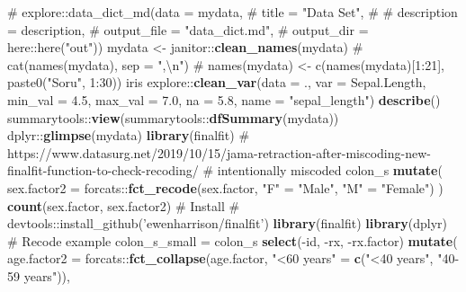 \documentclass[
]{article}
\newenvironment{Shaded}{\begin{snugshade}}{\end{snugshade}}
\newcommand{\CommentTok}[1]{\textcolor[rgb]{0.54,0.53,0.53}{#1}}
\newcommand{\DataTypeTok}[1]{\textcolor[rgb]{0.00,0.34,0.68}{#1}}
\newcommand{\FloatTok}[1]{\textcolor[rgb]{0.69,0.50,0.00}{#1}}
\newcommand{\KeywordTok}[1]{\textcolor[rgb]{0.12,0.11,0.11}{\textbf{#1}}}
\newcommand{\NormalTok}[1]{\textcolor[rgb]{0.12,0.11,0.11}{#1}}
\newcommand{\OperatorTok}[1]{\textcolor[rgb]{0.12,0.11,0.11}{#1}}
\newcommand{\StringTok}[1]{\textcolor[rgb]{0.75,0.01,0.01}{#1}}
\begin{document}
\begin{Shaded}
\begin{Highlighting}[]
{{{{{{{{{{{{{{{{{{{{{{{{{{{{{{{{{{{{{{{{{{{{{{{{{{{{{{{{{{{{{{{{{{{{{{{{{{{{{{{{{{{{{{{{{{{{{{\CommentTok{# explore::data_dict_md(data = mydata, }
\CommentTok{#              title = "Data Set", }
\CommentTok{#              # description =  description, }
\CommentTok{#              output_file = "data_dict.md",}
\CommentTok{#              output_dir = here::here("out"))}
\NormalTok{mydata <-}\StringTok{ }\NormalTok{janitor}\OperatorTok{::}\KeywordTok{clean_names}\NormalTok{(mydata)}
\CommentTok{# cat(names(mydata), sep = ",\textbackslash{}n")}
\CommentTok{# names(mydata) <- c(names(mydata)[1:21], paste0("Soru", 1:30))}
\NormalTok{iris }\OperatorTok{%>%}\StringTok{ }
\StringTok{  }\NormalTok{explore}\OperatorTok{::}\KeywordTok{clean_var}\NormalTok{(}\DataTypeTok{data =}\NormalTok{ ., }
                     \DataTypeTok{var =}\NormalTok{ Sepal.Length,  }
            \DataTypeTok{min_val =} \FloatTok{4.5}\NormalTok{, }
            \DataTypeTok{max_val =} \FloatTok{7.0}\NormalTok{, }
            \DataTypeTok{na =} \FloatTok{5.8}\NormalTok{, }
            \DataTypeTok{name =} \StringTok{"sepal_length"}\NormalTok{) }\OperatorTok{%>%}\StringTok{ }
\StringTok{  }\KeywordTok{describe}\NormalTok{()}
\NormalTok{summarytools}\OperatorTok{::}\KeywordTok{view}\NormalTok{(summarytools}\OperatorTok{::}\KeywordTok{dfSummary}\NormalTok{(mydata))}
\NormalTok{dplyr}\OperatorTok{::}\KeywordTok{glimpse}\NormalTok{(mydata)}
\KeywordTok{library}\NormalTok{(finalfit)}
\CommentTok{# https://www.datasurg.net/2019/10/15/jama-retraction-after-miscoding-new-finalfit-function-to-check-recoding/}
\CommentTok{# intentionally miscoded}
\NormalTok{colon_s }\OperatorTok{%>%}
\StringTok{  }\KeywordTok{mutate}\NormalTok{(}
    \DataTypeTok{sex.factor2 =}\NormalTok{ forcats}\OperatorTok{::}\KeywordTok{fct_recode}\NormalTok{(sex.factor,}
      \StringTok{"F"}\NormalTok{ =}\StringTok{ "Male"}\NormalTok{,}
      \StringTok{"M"}\NormalTok{ =}\StringTok{ "Female"}\NormalTok{)}
\NormalTok{  ) }\OperatorTok{%>%}
\StringTok{  }\KeywordTok{count}\NormalTok{(sex.factor, sex.factor2)}
\CommentTok{# Install}
\CommentTok{# devtools::install_github('ewenharrison/finalfit')}
\KeywordTok{library}\NormalTok{(finalfit)}
\KeywordTok{library}\NormalTok{(dplyr)}
\CommentTok{# Recode example}
\NormalTok{colon_s_small =}\StringTok{ }\NormalTok{colon_s }\OperatorTok{%>%}
\StringTok{  }\KeywordTok{select}\NormalTok{(}\OperatorTok{-}\NormalTok{id, }\OperatorTok{-}\NormalTok{rx, }\OperatorTok{-}\NormalTok{rx.factor) }\OperatorTok{%>%}
\StringTok{  }\KeywordTok{mutate}\NormalTok{(}
    \DataTypeTok{age.factor2 =}\NormalTok{ forcats}\OperatorTok{::}\KeywordTok{fct_collapse}\NormalTok{(age.factor,}
      \StringTok{"<60 years"}\NormalTok{ =}\StringTok{ }\KeywordTok{c}\NormalTok{(}\StringTok{"<40 years"}\NormalTok{, }\StringTok{"40-59 years"}\NormalTok{)),}
}}}}}}}}}}}}}}}}}}}}}}}}}}}}}}}}}}}}}}}}}}}}}}}}}}}}}}}}}}}}}}}}}}}}}}}}}}}}}}}}}}}}}}}}}}}}}}}}}}}}
\end{Highlighting}
\end{Shaded}
\end{document}

